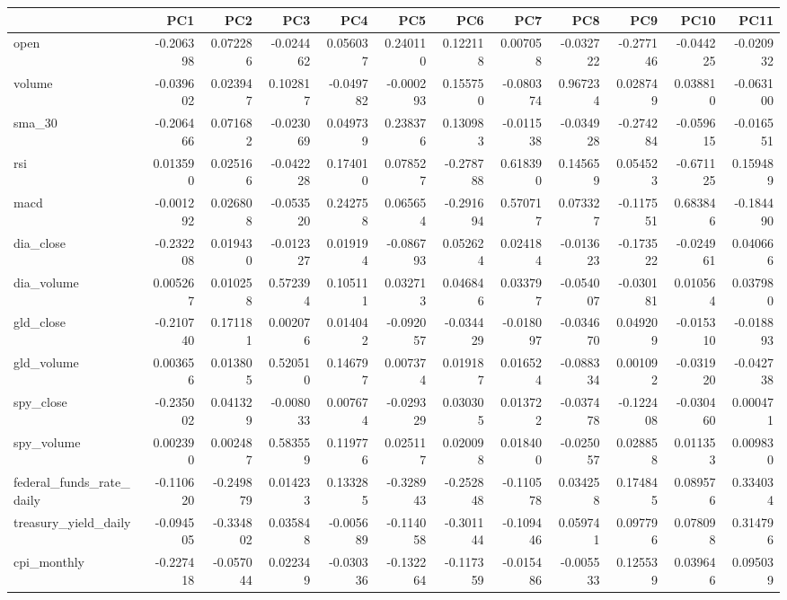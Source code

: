 \begin{tabular}{lrrrrrrrrrrr}
\toprule
 & PC1 & PC2 & PC3 & PC4 & PC5 & PC6 & PC7 & PC8 & PC9 & PC10 & PC11 \\
\midrule
open & -0.206398 & 0.072286 & -0.024462 & 0.056037 & 0.240110 & 0.122118 & 0.007058 & -0.032722 & -0.277146 & -0.044225 & -0.020932 \\
volume & -0.039602 & 0.023947 & 0.102817 & -0.049782 & -0.000293 & 0.155750 & -0.080374 & 0.967234 & 0.028749 & 0.038810 & -0.063100 \\
sma_30 & -0.206466 & 0.071682 & -0.023069 & 0.049739 & 0.238376 & 0.130983 & -0.011538 & -0.034928 & -0.274284 & -0.059615 & -0.016551 \\
rsi & 0.013590 & 0.025166 & -0.042228 & 0.174010 & 0.078527 & -0.278788 & 0.618390 & 0.145659 & 0.054523 & -0.671125 & 0.159489 \\
macd & -0.001292 & 0.026808 & -0.053520 & 0.242758 & 0.065654 & -0.291694 & 0.570717 & 0.073327 & -0.117551 & 0.683846 & -0.184490 \\
dia_close & -0.232208 & 0.019430 & -0.012327 & 0.019194 & -0.086793 & 0.052624 & 0.024184 & -0.013623 & -0.173522 & -0.024961 & 0.040666 \\
dia_volume & 0.005267 & 0.010258 & 0.572394 & 0.105111 & 0.032713 & 0.046846 & 0.033797 & -0.054007 & -0.030181 & 0.010564 & 0.037980 \\
gld_close & -0.210740 & 0.171181 & 0.002076 & 0.014042 & -0.092057 & -0.034429 & -0.018097 & -0.034670 & 0.049209 & -0.015310 & -0.018893 \\
gld_volume & 0.003656 & 0.013805 & 0.520510 & 0.146797 & 0.007374 & 0.019187 & 0.016524 & -0.088334 & 0.001092 & -0.031920 & -0.042738 \\
spy_close & -0.235002 & 0.041329 & -0.008033 & 0.007674 & -0.029329 & 0.030305 & 0.013722 & -0.037478 & -0.122408 & -0.030460 & 0.000471 \\
spy_volume & 0.002390 & 0.002487 & 0.583559 & 0.119776 & 0.025117 & 0.020098 & 0.018400 & -0.025057 & 0.028858 & 0.011353 & 0.009830 \\
federal_funds_rate_daily & -0.110620 & -0.249879 & 0.014233 & 0.133285 & -0.328943 & -0.252848 & -0.110578 & 0.034258 & 0.174845 & 0.089576 & 0.334034 \\
treasury_yield_daily & -0.094505 & -0.334802 & 0.035848 & -0.005689 & -0.114058 & -0.301144 & -0.109446 & 0.059741 & 0.097796 & 0.078098 & 0.314796 \\
cpi_monthly & -0.227418 & -0.057044 & 0.022349 & -0.030336 & -0.132264 & -0.117359 & -0.015486 & -0.005533 & 0.125539 & 0.039646 & 0.095039 \\

\end{tabular}
